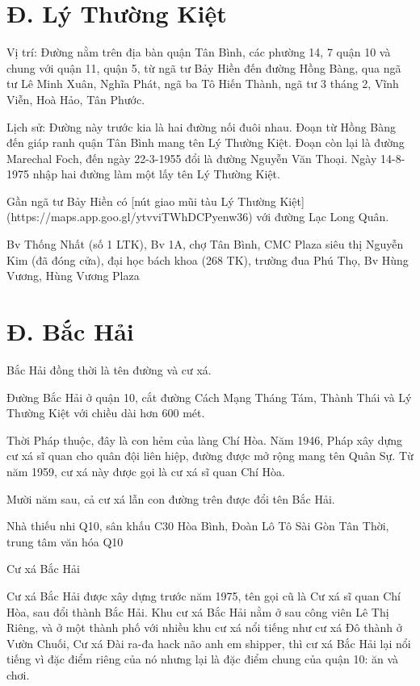 \section{Đ. Lý Thường Kiệt}

Vị trí: Đường nằm trên địa bàn quận Tân Bình, các phường 14, 7 quận 10 và chung với quận 11, quận 5, từ ngã tư Bảy Hiền đến đường Hồng Bàng, qua ngã tư Lê Minh Xuân, Nghĩa Phát, ngã ba Tô Hiến Thành, ngã tư 3 tháng 2, Vĩnh Viễn, Hoà Hảo, Tân Phước.

Lịch sử: Đường này trước kia là hai đường nối đuôi nhau. Đoạn từ Hồng Bàng đến giáp ranh quận Tân Bình mang tên Lý Thường Kiệt. Đoạn còn lại là đường Marechal Foch, đến ngày 22-3-1955 đổi là đường Nguyễn Văn Thoại. Ngày 14-8-1975 nhập hai đường làm một lấy tên Lý Thường Kiệt.

Gần ngã tư Bảy Hiền có [nút giao mũi tàu Lý Thường Kiệt](https://maps.app.goo.gl/ytvviTWhDCPyenw36) với đường Lạc Long Quân.

Bv Thống Nhất (số 1 LTK), Bv 1A, chợ Tân Bình, CMC Plaza siêu thị Nguyễn Kim (đã đóng cửa), đại học bách khoa (268 TK), trường đua Phú Thọ, Bv Hùng Vương, Hùng Vương Plaza

\section{Đ. Bắc Hải}

Bắc Hải đồng thời là tên đường và cư xá.

 Đường Bắc Hải ở quận 10, cắt đường Cách Mạng Tháng Tám, Thành Thái và Lý Thường Kiệt với chiều dài hơn 600 mét.

Thời Pháp thuộc, đây là con hẻm của làng Chí Hòa. Năm 1946, Pháp xây dựng cư xá sĩ quan cho quân đội liên hiệp, đường được mở rộng mang tên Quân Sự. Từ năm 1959, cư xá này được gọi là cư xá sĩ quan Chí Hòa.

Mười năm sau, cả cư xá lẫn con đường trên được đổi tên Bắc Hải.

Nhà thiếu nhi Q10, sân khấu C30 Hòa Bình, Đoàn Lô Tô Sài Gòn Tân Thời, trung tâm văn hóa Q10

Cư xá Bắc Hải

Cư xá Bắc Hải được xây dựng trước năm 1975, tên gọi cũ là Cư xá sĩ quan Chí Hòa, sau đổi thành Bắc Hải. Khu cư xá Bắc Hải nằm ở sau công viên Lê Thị Riêng, và ở một thành phố với nhiều khu cư xá nổi tiếng như cư xá Đô thành ở Vườn Chuối, Cư xá Đài ra-đa hack não anh em shipper, thì cư xá Bắc Hải lại nổi tiếng vì đặc điểm riêng của nó nhưng lại là đặc điểm chung của quận 10: ăn và chơi.

